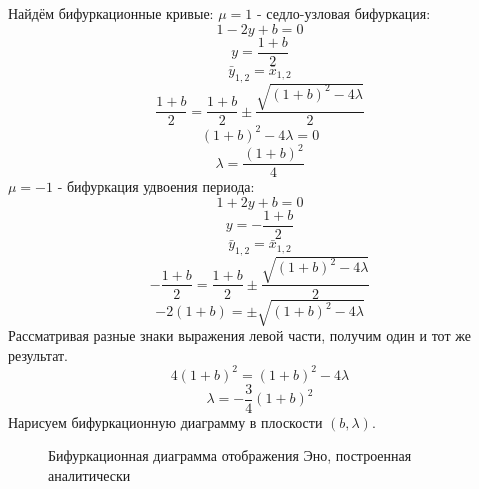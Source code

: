 \documentclass[12pt, a4paper]{article}
\begin{document}
Найдём бифуркационные кривые:
\newline
$\mu = 1$ - седло-узловая бифуркация:
\[ 1 - 2y + b = 0 \]
\[ y = \frac{1 + b}{2} \]
\[ \bar y_{1,2} = \bar x_{1,2} \]
\[ \frac{1 + b}{2} = \frac{1 + b}{2} \pm \frac{\sqrt{(1 + b)^2 - 4\lambda}}{2} \]
\[ (1 + b)^2 - 4\lambda = 0 \]
\[ \lambda = \frac{(1 + b)^2}{4} \]
\newline
$\mu = -1$ - бифуркация удвоения периода:
\[ 1 + 2y + b = 0 \]
\[ y = -\frac{1 + b}{2} \]
\[ \bar y_{1,2} = \bar x_{1,2} \]
\[ -\frac{1 + b}{2} = \frac{1 + b}{2} \pm \frac{\sqrt{(1 + b)^2 - 4\lambda}}{2} \]
\[ -2(1 + b) = \pm \sqrt{(1 + b)^2 - 4\lambda} \]
Рассматривая разные знаки выражения левой части, получим один и тот же результат.
\[ 4(1 + b)^2 = (1 + b)^2 - 4\lambda \]
\[ \lambda = -\frac{3}{4} (1 + b)^2 \]
Нарисуем бифуркационную диаграмму в плоскости $(b, \lambda) $.
\begin{figure}[H]
	\caption{Бифуркационная диаграмма отображения Эно, построенная аналитически}
\end{figure}
\end{document}

